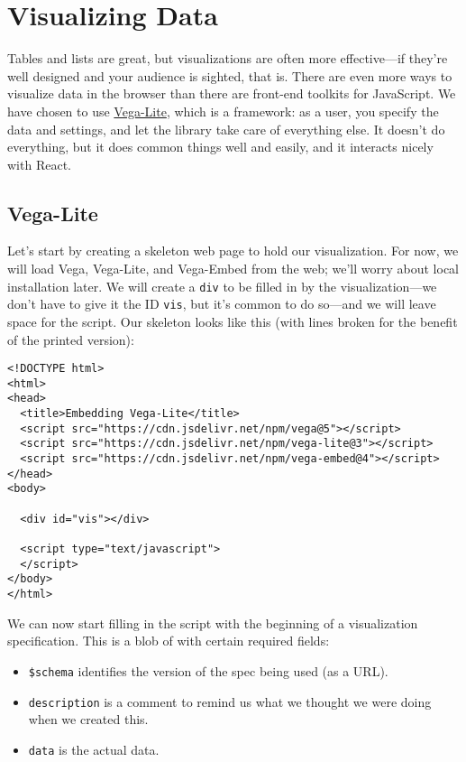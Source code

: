 \chapter{Visualizing Data}\label{s:vis}

Tables and lists are great, but visualizations are often more effective---if
they're well designed and your audience is sighted, that is.
There are even more ways to visualize data in the browser
than there are front-end toolkits for JavaScript.
We have chosen to use \href{http://vega.github.io/}{Vega-Lite},
which is a  framework:
as a user,
you specify the data and settings,
and let the library take care of everything else.
It doesn't do everything,
but it does common things well and easily,
and it interacts nicely with React.

\section{Vega-Lite}\label{s:vis-vega-lite}

Let's start by creating a skeleton web page to hold our visualization.
For now, we will load Vega, Vega-Lite, and Vega-Embed from the web;
we'll worry about local installation later.
We will create a \texttt{div} to be filled in by the visualization---we
don't have to give it the ID \texttt{vis}, but it's common to do so---and
we will leave space for the script.
Our skeleton looks like this
(with lines broken for the benefit of the printed version):

\begin{verbatim}
<!DOCTYPE html>
<html>
<head>
  <title>Embedding Vega-Lite</title>
  <script src="https://cdn.jsdelivr.net/npm/vega@5"></script>
  <script src="https://cdn.jsdelivr.net/npm/vega-lite@3"></script>
  <script src="https://cdn.jsdelivr.net/npm/vega-embed@4"></script>
</head>
<body>

  <div id="vis"></div>

  <script type="text/javascript">
  </script>
</body>
</html>
\end{verbatim}

We can now start filling in the script with the beginning of a visualization specification.
This is a blob of  with certain required fields:

\begin{itemize}
\item
  \texttt{\$schema} identifies the version of the spec being used (as a URL).
\item
  \texttt{description} is a comment to remind us what we thought we were doing when we created this.
\item
  \texttt{data} is the actual data.
\end{itemize}

